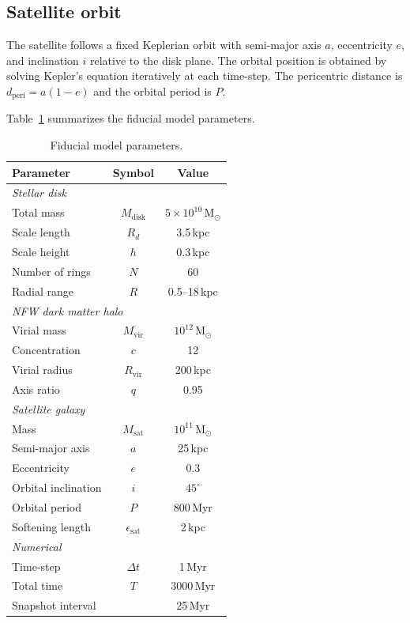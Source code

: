 \subsection{Satellite orbit}
\label{sec:orbit}

The satellite follows a fixed Keplerian orbit with semi-major axis $a$, eccentricity $e$, and inclination $i$ relative to the disk plane. The orbital position is obtained by solving Kepler's equation iteratively at each time-step. The pericentric distance is $d_\mathrm{peri} = a(1-e)$ and the orbital period is $P$.

Table~\ref{tab:params} summarizes the fiducial model parameters.

\begin{table}
    \centering
    \caption{Fiducial model parameters.}
    \label{tab:params}
    \begin{tabular}{lcc}
        \toprule
        Parameter & Symbol & Value \\
        \midrule
        \multicolumn{3}{l}{\textit{Stellar disk}} \\
        Total mass & $M_\mathrm{disk}$ & $5\times10^{10}\,\mathrm{M}_\odot$ \\
        Scale length & $R_d$ & 3.5\,kpc \\
        Scale height & $h$ & 0.3\,kpc \\
        Number of rings & $N$ & 60 \\
        Radial range & $R$ & 0.5--18\,kpc \\
        \midrule
        \multicolumn{3}{l}{\textit{NFW dark matter halo}} \\
        Virial mass & $M_\mathrm{vir}$ & $10^{12}\,\mathrm{M}_\odot$ \\
        Concentration & $c$ & 12 \\
        Virial radius & $R_\mathrm{vir}$ & 200\,kpc \\
        Axis ratio & $q$ & 0.95 \\
        \midrule
        \multicolumn{3}{l}{\textit{Satellite galaxy}} \\
        Mass & $M_\mathrm{sat}$ & $10^{11}\,\mathrm{M}_\odot$ \\
        Semi-major axis & $a$ & 25\,kpc \\
        Eccentricity & $e$ & 0.3 \\
        Orbital inclination & $i$ & $45^\circ$ \\
        Orbital period & $P$ & 800\,Myr \\
        Softening length & $\epsilon_\mathrm{sat}$ & 2\,kpc \\
        \midrule
        \multicolumn{3}{l}{\textit{Numerical}} \\
        Time-step & $\Delta t$ & 1\,Myr \\
        Total time & $T$ & 3000\,Myr \\
        Snapshot interval & & 25\,Myr \\
        \bottomrule
    \end{tabular}
\end{table}

